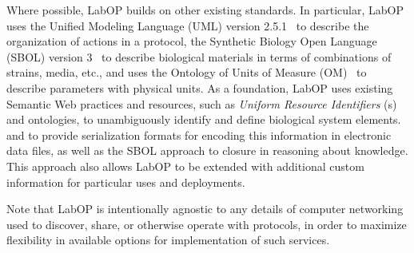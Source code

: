 Where possible, LabOP builds on other existing standards.
In particular, LabOP uses the Unified Modeling Language (UML) version 2.5.1~\citep{uml251} to describe the organization of actions in a protocol, the Synthetic Biology Open Language (SBOL) version 3~\citep{SBOL3} to describe biological materials in terms of combinations of strains, media, etc., and uses the Ontology of Units of Measure (OM)~\citep{om2} to describe parameters with physical units.
As a foundation, LabOP uses existing Semantic Web practices and resources, such as \emph{Uniform Resource Identifiers} (s) and ontologies, to unambiguously identify and define biological system elements.
and to provide serialization formats for encoding this information in electronic data files, as well as the SBOL approach to closure in reasoning about knowledge.
This approach also allows LabOP to be extended with additional custom information for particular uses and deployments.

Note that LabOP is intentionally agnostic to any details of computer networking used to discover, share, or otherwise operate with protocols, in order to maximize flexibility in available options for implementation of such services.
